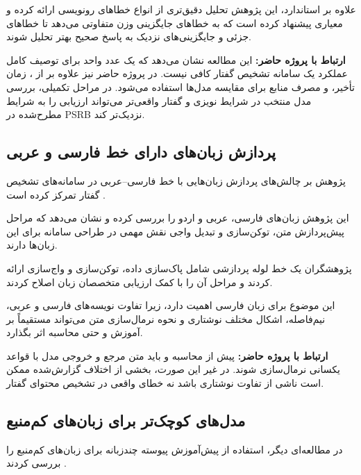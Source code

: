 علاوه بر  استاندارد، این پژوهش تحلیل دقیق‌تری از انواع
خطاهای رونویسی ارائه کرده و معیاری پیشنهاد کرده است که به
خطاهای جایگزینی وزن متفاوتی می‌دهد تا خطاهای جزئی و
جایگزینی‌های نزدیک به پاسخ صحیح بهتر تحلیل شوند.

\textbf{ارتباط با پروژه حاضر:}
این مطالعه نشان می‌دهد که یک عدد  واحد برای توصیف کامل
عملکرد یک سامانه تشخیص گفتار کافی نیست.
در پروژه حاضر نیز علاوه بر  از ، زمان تأخیر،
 و مصرف منابع برای مقایسه مدل‌ها استفاده می‌شود.
در مراحل تکمیلی، بررسی مدل منتخب در شرایط نویزی و گفتار
واقعی‌تر می‌تواند ارزیابی را به شرایط مطرح‌شده در PSRB
نزدیک‌تر کند.


\subsection{پردازش زبان‌های دارای خط فارسی و عربی}

پژوهش
بر چالش‌های پردازش زبان‌هایی با خط فارسی--عربی در سامانه‌های
تشخیص گفتار تمرکز کرده است
\cite{bandarupalli2025persoarabic}.

این پژوهش زبان‌های فارسی، عربی و اردو را بررسی کرده و نشان
می‌دهد که مراحل پیش‌پردازش متن، توکن‌سازی و تبدیل واجی نقش
مهمی در طراحی سامانه  برای این زبان‌ها دارند.

پژوهشگران یک خط لوله پردازشی شامل پاک‌سازی داده،
توکن‌سازی و واج‌سازی
ارائه کردند و مراحل آن را با کمک ارزیابی متخصصان زبان اصلاح
کردند.

این موضوع برای زبان فارسی اهمیت دارد، زیرا تفاوت نویسه‌های
فارسی و عربی، نیم‌فاصله، اشکال مختلف نوشتاری و نحوه نرمال‌سازی
متن می‌تواند مستقیماً بر آموزش و حتی محاسبه  اثر بگذارد.

\textbf{ارتباط با پروژه حاضر:}
پیش از محاسبه  و  باید متن مرجع و خروجی مدل با قواعد
یکسانی نرمال‌سازی شوند.
در غیر این صورت، بخشی از اختلاف گزارش‌شده ممکن است ناشی از
تفاوت نوشتاری باشد نه خطای واقعی در تشخیص محتوای گفتار.


\subsection{مدل‌های کوچک‌تر برای زبان‌های کم‌منبع}

در مطالعه‌ای دیگر،
استفاده از پیش‌آموزش پیوسته چندزبانه برای زبان‌های کم‌منبع
را بررسی کردند
\cite{bandarupalli2025efficient}.

